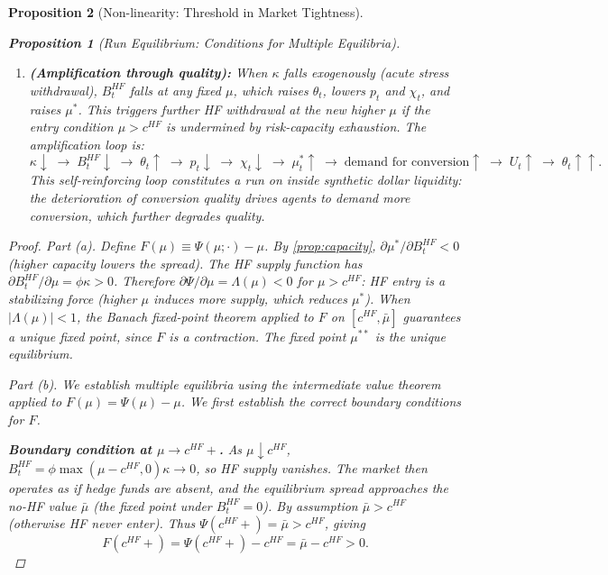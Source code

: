 \documentclass[12pt]{article}
\newtheorem{proposition}{Proposition}
\theoremstyle{definition}
\newcommand{\1}[1]{\mathds{1}\left[#1\right]}
\begin{document}
\begin{proposition}[Non-linearity: Threshold in Market Tightness]
\begin{proposition}[Run Equilibrium: Conditions for Multiple Equilibria]
\begin{enumerate}[label=(\alph*)]
    \item \textbf{(Amplification through quality):} When $\kappa$ falls
    exogenously (acute stress withdrawal), $B_t^{HF}$ falls at any fixed
    $\mu$, which raises $\theta_t$, lowers $p_t$ and $\chi_t$, and raises
    $\mu^*$. This triggers further HF withdrawal at the new higher $\mu$ if
    the entry condition $\mu > c^{HF}$ is undermined by risk-capacity
    exhaustion. The amplification loop is:
    \[
      \kappa \downarrow \;\to\; B_t^{HF} \downarrow \;\to\; \theta_t \uparrow
      \;\to\; p_t \downarrow \;\to\; \chi_t \downarrow \;\to\; \mu_t^* \uparrow
      \;\to\; \text{demand for conversion} \uparrow \;\to\; U_t \uparrow
      \;\to\; \theta_t \uparrow\uparrow.
    \]
    This self-reinforcing loop constitutes a \emph{run on inside synthetic dollar
    liquidity}: the deterioration of conversion quality drives agents to demand
    more conversion, which further degrades quality.
  \end{enumerate}
\end{proposition}

\begin{proof}
  \textit{Part (a).} Define $F(\mu) \equiv \Psi(\mu;\cdot) - \mu$. By
  \cref{prop:capacity}, $\partial\mu^*/\partial B_t^{HF} < 0$ (higher capacity
  lowers the spread). The HF supply function has $\partial B_t^{HF}/\partial\mu
  = \phi\kappa > 0$. Therefore $\partial\Psi/\partial\mu = \Lambda(\mu) < 0$
  for $\mu > c^{HF}$: HF entry is a stabilizing force (higher $\mu$ induces
  more supply, which reduces $\mu^*$). When $|\Lambda(\mu)| < 1$, the Banach
  fixed-point theorem applied to $F$ on $[c^{HF}, \bar\mu]$ guarantees a unique
  fixed point, since $F$ is a contraction. The fixed point $\mu^{**}$ is the
  unique equilibrium.

  \textit{Part (b).} We establish multiple equilibria using the intermediate
  value theorem applied to $F(\mu) = \Psi(\mu) - \mu$. We first establish
  the correct boundary conditions for $F$.

  \textbf{Boundary condition at $\mu \to c^{HF}+$.} As $\mu \downarrow c^{HF}$,
  $B_t^{HF} = \phi\max(\mu - c^{HF},0)\kappa \to 0$, so HF supply vanishes.
  The market then operates as if hedge funds are absent, and the equilibrium
  spread approaches the no-HF value $\bar\mu$ (the fixed point under
  $B_t^{HF} = 0$). By assumption $\bar\mu > c^{HF}$ (otherwise HF never
  enter). Thus $\Psi(c^{HF}+) = \bar\mu > c^{HF}$, giving
  \[
    F(c^{HF}+) = \Psi(c^{HF}+) - c^{HF} = \bar\mu - c^{HF} > 0.
  \]


\end{proof}
\end{proposition}
\end{document}
